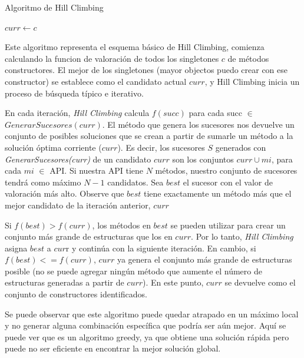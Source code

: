 \begin{algorithm}[H]
  \caption{Algoritmo de Hill Climbing}
  \label{algo:hill_climbing}
  \SetAlgoLined
  $curr \gets c$\; 
  
  \;
\end{algorithm}

Este algoritmo representa el esquema básico de Hill Climbing, comienza calculando la funcion de valoración de todos los singletones ${c}$ de métodos constructores.  El mejor de los singletones (mayor objectos puedo crear con ese constructor) se establece como el candidato actual $curr$, y Hill Climbing inicia un proceso de búsqueda típico e iterativo.

En cada iteración, \emph{Hill Climbing} calcula $f(succ)$ para cada succ $\in$ $GenerarSucesores(curr)$. El método que genera los sucesores nos devuelve un conjunto de posibles soluciones que se crean a partir de sumarle un método a la solución óptima corriente ($curr$). Es decir, los sucesores  $S$ generados con \emph{GenerarSucesores(curr)} de un candidato $curr$ son los conjuntos {$curr\cup{mi}$}, para cada $mi$ $\in$ API. Si nuestra API tiene $N$ métodos, nuestro conjunto de sucesores tendrá como máximo $N-1$ candidatos.
Sea $best$ el sucesor con el valor de valoración más alto. Observe que $best$ tiene exactamente un método más que el mejor candidato de la iteración anterior, $curr$

Si $f(best) > f(curr)$, los métodos en $best$ se pueden utilizar para crear un conjunto más grande de estructuras que los en $curr$. Por lo tanto, \emph{Hill Climbing} asigna $best$ a $cur$r y continúa con la siguiente iteración. En cambio, si $f(best) <= f(curr)$, $curr$ ya genera el conjunto más grande de estructuras posible (no se puede agregar ningún método que aumente el número de estructuras generadas a partir de $curr$). En este punto, $curr$ se devuelve como el conjunto de constructores identificados.

Se puede observar que este algoritmo puede quedar atrapado en un máximo local y no generar alguna combinación específica que podría ser aún mejor. Aquí se puede ver que es un algoritmo greedy, ya que obtiene una solución rápida pero puede no ser eficiente en encontrar la mejor solución global.


